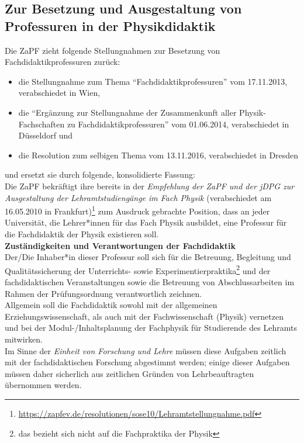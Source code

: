 
\subsection*{Zur Besetzung und Ausgestaltung von Professuren in der Physikdidaktik}
Die ZaPF zieht folgende Stellungnahmen zur Besetzung von Fachdidaktikprofessuren zurück:
\begin{itemize}
\item die Stellungnahme zum Thema "`Fachdidaktikprofessuren"' vom 17.11.2013, verabschiedet in Wien,
\item die "`Ergänzung zur Stellungnahme der Zusammenkunft aller Physik-Fachschaften zu Fachdidaktikprofessuren"' vom 01.06.2014, verabschiedet in Düsseldorf und
\item die Resolution zum selbigen Thema vom 13.11.2016, verabschiedet in Dresden
\end{itemize}
und ersetzt sie durch folgende, konsolidierte Fassung:
\vspace{0.5\baselineskip}\\
Die ZaPF bekräftigt ihre bereits in der \textit{Empfehlung der ZaPF und der jDPG zur Ausgestaltung der Lehramtstudiengänge im Fach Physik}
(verabschiedet am 16.05.2010 in Frankfurt)\footnote{\url{https://zapfev.de/resolutionen/sose10/Lehramtstellungnahme.pdf}} zum Ausdruck gebrachte Position, dass an jeder Universität, die Lehrer*innen für das Fach Physik ausbildet, eine Professur für die Fachdidaktik der Physik existieren soll.
\vspace{0.5\baselineskip}\\
\textbf{Zuständigkeiten und Verantwortungen der Fachdidaktik}\\
Der/Die Inhaber*in dieser Professur soll sich für die Betreuung, Begleitung und Qualitäts\-sicherung der Unterrichts- sowie Experimentierpraktika\footnote{das bezieht sich nicht auf die Fachpraktika der Physik} und der fachdidaktischen Veranstaltungen sowie die  Betreuung von Abschlussarbeiten im Rahmen der Prüfungsordnung verantwortlich zeichnen.\\
Allgemein soll die Fachdidaktik sowohl mit der allgemeinen Erziehungswissenschaft, als auch mit der Fachwissenschaft (Physik) vernetzen und bei der Modul-/Inhaltsplanung der Fachphysik für Studierende des Lehramts mitwirken.\\\newpage
Im Sinne der \textit{Einheit von Forschung und Lehre} müssen diese Aufgaben zeitlich mit der fachdidaktischen Forschung abgestimmt werden; einige dieser Aufgaben müssen daher sicherlich aus zeitlichen Gründen von Lehrbeauftragten übernommen werden.

